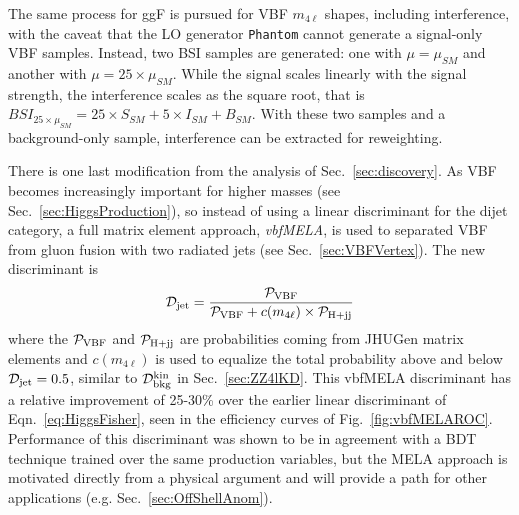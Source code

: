 The same process for ggF is pursued for VBF $m_{4\ell}$ shapes, including interference, with the caveat that the LO generator {\tt Phantom} cannot generate a signal-only VBF samples. Instead, two BSI samples are generated: one with $\mu=\mu_{SM}$ and another with $\mu=25\times\mu_{SM}$. While the signal scales linearly with the signal strength, the interference scales as the square root, that is $BSI_{25\times\mu_{SM}} = 25\times S_{SM} + 5\times I_{SM} + B_{SM}$. With these two samples and a background-only sample, interference can be extracted for reweighting.

There is one last modification from the analysis of Sec.~\ref{sec:discovery}. As VBF becomes increasingly important for higher masses (see Sec.~\ref{sec:HiggsProduction}), so instead of using a linear discriminant for the dijet category, a full matrix element approach, \textit{vbfMELA}, is used to separated VBF from gluon fusion with two radiated jets (see Sec.~\ref{sec:VBFVertex}). The new discriminant is 
\begin{equation}
\mathcal{D}_{\rm{jet}}=\frac{\mathcal{P}_{\rm{VBF}}}{\mathcal{P}_{\rm{VBF}} + c(m_{4\ell})\times \mathcal{P}_{\rm{H+jj}}}
\end{equation}
where the $\mathcal{P}_{\rm{VBF}}$ and $\mathcal{P}_{\rm{H+jj}}$ are probabilities coming from JHUGen matrix elements and $c(m_{4\ell})$ is used to equalize the total probability above and below $\mathcal{D}_{\rm jet}=0.5$, similar to $\mathcal{D}_{\rm{bkg}}^{\rm{kin}}$ in Sec.~\ref{sec:ZZ4lKD}. This vbfMELA discriminant has a relative improvement of 25-30\% over the earlier linear discriminant of Eqn.~\ref{eq:HiggsFisher}, seen in the efficiency curves of Fig.~\ref{fig:vbfMELAROC}. Performance of this discriminant was shown to be in agreement with a BDT technique trained over the same production variables, but the MELA approach is motivated directly from a physical argument and will provide a path for other applications (e.g. Sec.~\ref{sec:OffShellAnom}).

